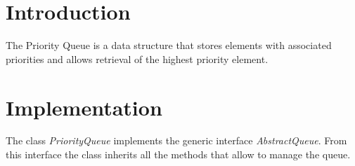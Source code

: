 \section{Introduction}
The Priority Queue is a data structure that stores elements with associated priorities and allows retrieval of the highest priority element.

\section{Implementation}
The class \textit{PriorityQueue} implements the generic interface  \textit{AbstractQueue}.
From this interface the class inherits all the methods that allow to manage the queue.